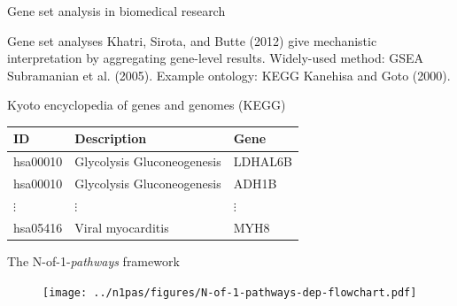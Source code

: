 \documentclass[ignorenonframetext,aspectratio=169,]{beamer}
\begin{document}
\begin{frame}{%
\protect\hypertarget{gene-set-analysis-in-biomedical-research}{%
Gene set analysis in biomedical research}}

Gene set analyses Khatri, Sirota, and Butte (2012) give mechanistic
interpretation by aggregating gene-level results. Widely-used method:
GSEA Subramanian et al. (2005). Example ontology: KEGG Kanehisa and Goto
(2000).

\begin{block}{Kyoto encyclopedia of genes and genomes (KEGG)}

\begin{table}
         \begin{tabular}{lll}
           ID & Description & Gene\\
           \hline
           hsa00010 & Glycolysis Gluconeogenesis & LDHAL6B\\
           hsa00010 & Glycolysis Gluconeogenesis & ADH1B\\
           $\vdots$ & $\vdots$ & $\vdots$\\
           hsa05416 & Viral myocarditis & MYH8\\
         \end{tabular}
\end{table}

\end{block}

\end{frame}

\begin{frame}{%
\protect\hypertarget{the-n-of-1-pathways-framework}{%
The N-of-1-\emph{pathways} framework}}

\begin{figure}[htb]
    \centering
\texttt{[image: ../n1pas/figures/N-of-1-pathways-dep-flowchart.pdf]}
\end{figure}

\end{frame}
\end{document}
